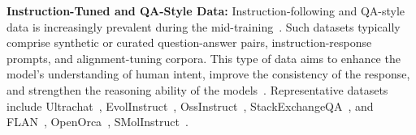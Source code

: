 

\noindent\textbf{Instruction-Tuned and QA-Style Data:}
Instruction-following and QA-style data is increasingly prevalent during the mid-training~\cite{adler2024nemotron, hu2024minicpm, abdin2024phi, Zhang2024MAPNeoHC, sun2024hunyuan, olmo20242, chen2025minimax, tang2025pangu}. 
Such datasets typically comprise synthetic or curated question-answer pairs, instruction-response prompts, and alignment-tuning corpora. This type of data aims to enhance the model’s understanding of human intent, improve the consistency of the response, and strengthen the reasoning ability of the models~\cite{abdin2024phi}.
Representative datasets include Ultrachat~\cite{ding2023enhancing}, EvolInstruct~\cite{surge2024openbezoar}, OssInstruct~\cite{wei2024magicoder}, StackExchangeQA~\cite{olmo20242}, and FLAN~\cite{longpre2023flan}, OpenOrca~\cite{OpenOrca}, SMolInstruct~\cite{yu2024llasmol}.

